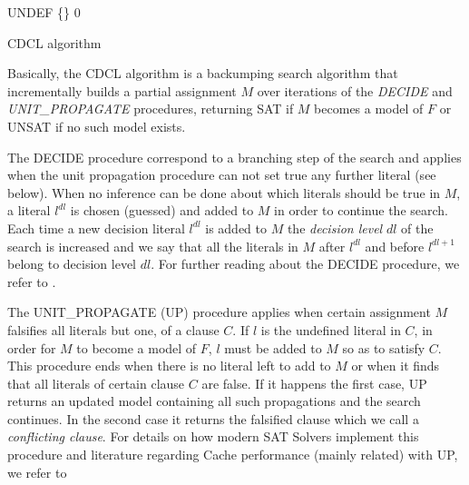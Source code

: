 \documentclass{llncs}
\begin{document}
\begin{algorithm}[h]
\SetLine
{}
 \BlankLine
 \Status \assign UNDEF\;
 \Model \assign \{\}\;
 \Dl \assign $0$\;
 \Return \Status
 \caption{CDCL algorithm}
 \label{alg:cdcl}
\end{algorithm}

Basically, the CDCL algorithm is a backumping search algorithm that
incrementally builds a partial assignment $M$ over iterations of the
\emph{DECIDE} and \emph{UNIT\_PROPAGATE} procedures, returning SAT if
$M$ becomes a model of $F$ or UNSAT if no such model exists.

The DECIDE procedure correspond to a branching step of the search and
applies when the unit propagation procedure can not set true any
further literal (see below).  When no inference can be done about
which literals should be true in $M$, a literal $l^{dl}$ is chosen
(guessed) and added to $M$ in order to continue the search.  Each time
a new decision literal $l^{dl}$ is added to $M$ the \emph{ decision
  level} $dl$ of the search is increased and we say that all the
literals in $M$ after $l^{dl}$ and before $l^{dl+1}$ belong to
decision level $dl$.  For further reading about the DECIDE procedure,
we refer to \cite{Chaff2001,MiniSat,rsat}.

The UNIT\_PROPAGATE (UP) procedure applies when certain assignment $M$
falsifies all literals but one, of a clause $C$.  If $l$ is the
undefined literal in $C$, in order for $M$ to become a model of $F$,
$l$ must be added to $M$ so as to satisfy $C$. This procedure ends
when there is no literal left to add to $M$ or when it finds that all
literals of certain clause $C$ are false.  If it happens the first
case, UP returns an updated model containing all such propagations and
the search continues.  In the second case it returns the falsified
clause which we call a \emph{conflicting clause}.  For details on how
modern SAT Solvers implement this procedure and literature regarding
Cache performance (mainly related) with UP, we refer to
\cite{Chaff2001,ZhangMalik2003SAT}
 
\end{document}
